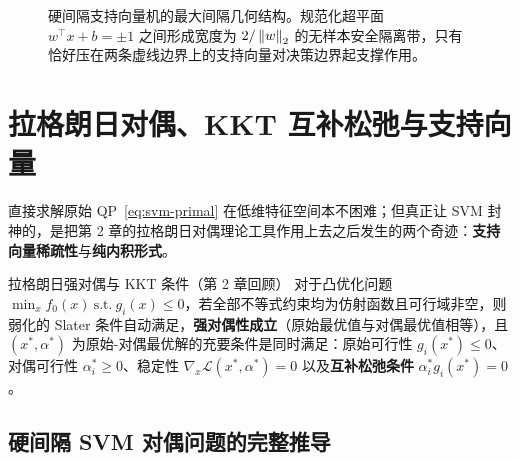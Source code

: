 \begin{figure}[htbp]
\caption{硬间隔支持向量机的最大间隔几何结构。规范化超平面 $w^\top x + b = \pm 1$ 之间形成宽度为 $2/\left\|w\right\|_2$ 的无样本安全隔离带，只有恰好压在两条虚线边界上的支持向量对决策边界起支撑作用。}
\label{fig:svm-geometry}
\end{figure}

\section{拉格朗日对偶、KKT 互补松弛与支持向量}\label{sec:svm-dual}

直接求解原始 QP~\eqref{eq:svm-primal} 在低维特征空间本不困难；但真正让 SVM 封神的，是把第 2 章的拉格朗日对偶理论工具作用上去之后发生的两个奇迹：\textbf{支持向量稀疏性}与\textbf{纯内积形式}。

\begin{recallBox}{拉格朗日强对偶与 KKT 条件（第 2 章回顾）}
对于凸优化问题 $\min_x f_0(x)\ \text{s.t.}\ g_i(x)\le 0$，若全部不等式约束均为仿射函数且可行域非空，则弱化的 Slater 条件自动满足，\textbf{强对偶性成立}（原始最优值与对偶最优值相等），且 $(x^*, \alpha^*)$ 为原始-对偶最优解的充要条件是同时满足：原始可行性 $g_i(x^*)\le 0$、对偶可行性 $\alpha_i^* \ge 0$、稳定性 $\nabla_x \mathcal{L}(x^*, \alpha^*) = 0$ 以及\textbf{互补松弛条件} $\alpha_i^* g_i(x^*) = 0$。
\end{recallBox}

\subsection{硬间隔 SVM 对偶问题的完整推导}

